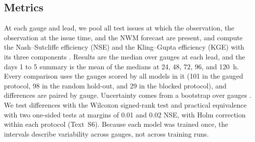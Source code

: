 \documentclass[draft]{agujournal2019}
\begin{document}
\subsection{Metrics}
\label{sec:metrics}

At each gauge and lead, we pool all test issues at which the observation, the observation at the issue time, and the NWM forecast are present, and compute the Nash--Sutcliffe efficiency (NSE) \cite{Nash1970} and the Kling--Gupta efficiency (KGE) with its three components \cite{Gupta2009}. Results are the median over gauges at each lead, and the days 1 to 5 summary is the mean of the medians at 24, 48, 72, 96, and 120~h. Every comparison uses the gauges scored by all models in it (101 in the gauged protocol, 98 in the random hold-out, and 29 in the blocked protocol), and differences are paired by gauge. Uncertainty comes from a bootstrap over gauges \cite{Efron1993}. We test differences with the Wilcoxon signed-rank test \cite{Wilcoxon1945} and practical equivalence with two one-sided tests \cite{Schuirmann1987} at margins of 0.01 and 0.02 NSE, with Holm correction within each protocol \cite{Holm1979} (Text~S6). Because each model was trained once, the intervals describe variability across gauges, not across training runs.

\end{document}
